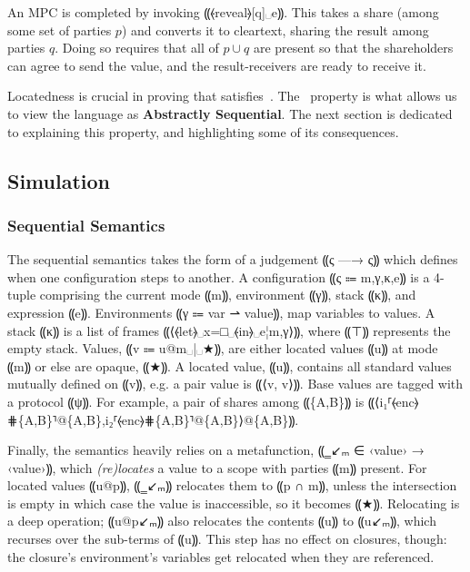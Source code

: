 An MPC is completed by invoking ⸨⦑reveal⦒[q]␣e⸩. This takes a share
(among some set of parties $p$) and converts it to cleartext,
sharing the result among parties $q$. Doing so requires that all of
$p \cup q$ are present so that the shareholders
can agree to send the value, and the result-receivers are ready to
receive it.

Locatedness is crucial in proving that \mpc{} satisfies~.
The~ property is what allows us to view the language as \textbf{Abstractly Sequential}. The
next section is dedicated to explaining this property, and highlighting some of its consequences.

\subsection{Simulation}
\label{sec:lam-mpc-simulation}

\subsubsection{Sequential Semantics}


The sequential semantics takes the form of a judgement ⸨ς —→ ς⸩ which
defines when one configuration steps to another. A configuration
⸨ς ⩴ m,γ,κ,e⸩ is a 4-tuple comprising the current mode ⸨m⸩, environment ⸨γ⸩, stack
⸨κ⸩, and expression ⸨e⸩. Environments ⸨γ ⩴ var ⇀ value⸩, map variables to
values. A stack ⸨κ⸩ is a list of frames ⸨⟨⦑let⦒␣x=□␣⦑in⦒␣e¦m,γ⟩⸩, where
⸨⊤⸩ represents the empty stack. Values, ⸨v ⩴ u@m␣|␣★⸩, are either located
values ⸨u⸩ at mode ⸨m⸩ or else are opaque, ⸨★⸩. A located value, ⸨u⸩,
contains all standard values mutually defined on ⸨v⸩, e.g. a pair value is ⸨⟨v, v⟩⸩.
Base values are tagged with a protocol ⸨ψ⸩. For example, a
pair of shares among ⸨\{A,B\}⸩ is ⸨⟨i₁⸢⦑enc⦒⋕\{A,B\}⸣@\{A,B\},i₂⸢⦑enc⦒⋕\{A,B\}⸣@\{A,B\}⟩@\{A,B\}⸩.

Finally, the semantics heavily relies on a metafunction, ⸨‗↙ₘ ∈ ‹value› → ‹value›⸩, which \emph{(re)locates} a
value to a scope with parties ⸨m⸩ present. For located values ⸨u@p⸩, ⸨‗↙ₘ⸩
relocates them to ⸨p ∩ m⸩, unless the intersection is empty in which case the
value is inaccessible, so it becomes ⸨★⸩. Relocating is a deep operation;
⸨u@p↙ₘ⸩ also relocates the contents ⸨u⸩ to ⸨u↙ₘ⸩, which recurses over
the sub-terms of ⸨u⸩. This step has no effect on closures, though: the closure's
environment's variables get relocated when they are referenced.

